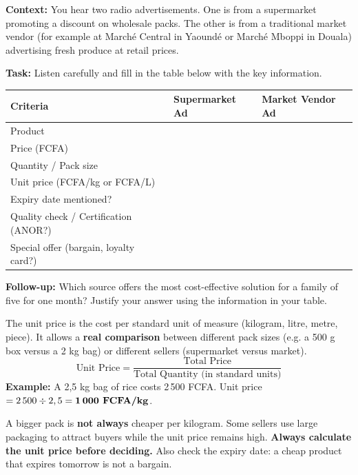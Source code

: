 \documentclass[11pt]{article}
\newcommand{\cle}[1]{{\popxbold\color{popdark}#1}}
\begin{document}
\begin{experience}
\textbf{Context:} You hear two radio advertisements. One is from a supermarket promoting a \cle{discount} on wholesale packs. The other is from a traditional market vendor (for example at Marché Central in Yaoundé or Marché Mboppi in Douala) advertising fresh produce at \cle{retail} prices.

\textbf{Task:} Listen carefully and fill in the table below with the \cle{key information}.
\begin{center}
\begin{tabularx}{\linewidth}{|l|X|X|}\hline
\rowcolor{popblueL}\textbf{Criteria} & \textbf{Supermarket Ad} & \textbf{Market Vendor Ad} \\ \hline
Product & & \\ \hline
Price (FCFA) & & \\ \hline
Quantity / Pack size & & \\ \hline
\cle{Unit price} (FCFA/kg or FCFA/L) & & \\ \hline
\cle{Expiry date} mentioned? & & \\ \hline
\cle{Quality check} / Certification (ANOR?) & & \\ \hline
Special offer (\cle{bargain}, loyalty card?) & & \\ \hline
\end{tabularx}
\end{center}

\textbf{Follow-up:} Which source offers the most \cle{cost-effective} solution for a family of five for one month? Justify your answer using the information in your table.
\end{experience}

\begin{definition}
The \cle{unit price} is the cost per standard unit of measure (kilogram, litre, metre, piece). It allows a \textbf{real comparison} between different pack sizes (e.g. a 500 g box versus a 2 kg bag) or different sellers (supermarket versus market).
\[
\text{Unit Price} = \frac{\text{Total Price}}{\text{Total Quantity (in standard units)}}
\]
\textbf{Example:} A 2,5 kg bag of rice costs 2\,500 FCFA. Unit price $= 2\,500 \div 2,5 = \textbf{1\,000 FCFA/kg}$.
\end{definition}

\begin{attention}
A bigger pack is \textbf{not always} cheaper per kilogram. Some sellers use large packaging to attract buyers while the \cle{unit price} remains high. \textbf{Always calculate the unit price before deciding.} Also check the \cle{expiry date}: a cheap product that expires tomorrow is not a \cle{bargain}.
\end{attention}
\end{document}
